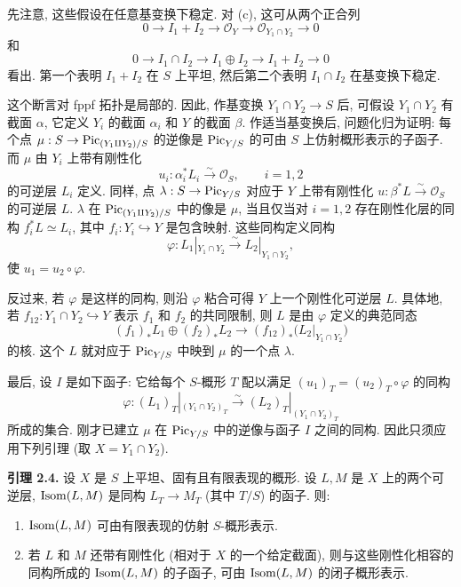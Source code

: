 先注意, 这些假设在任意基变换下稳定. 对 (c), 这可从两个正合列
\[
  0\longrightarrow I_1+I_2\longrightarrow\mathcal O_Y
  \longrightarrow\mathcal O_{Y_1\cap Y_2}\longrightarrow0
\]
和
\[
  0\longrightarrow I_1\cap I_2\longrightarrow I_1\oplus I_2
  \longrightarrow I_1+I_2\longrightarrow0
\]
看出. 第一个表明 $I_1+I_2$ 在 $S$ 上平坦, 然后第二个表明 $I_1\cap I_2$ 在基变换下稳定.

这个断言对 fppf 拓扑是局部的. 因此, 作基变换 $Y_1\cap Y_2\to S$ 后, 可假设 $Y_1\cap Y_2$ 有截面 $\alpha$, 它定义 $Y_i$ 的截面 $\alpha_i$ 和 $Y$ 的截面 $\beta$. 作适当基变换后, 问题化归为证明: 每个点 $\mu:S\to\operatorname{Pic}_{(Y_1\amalg Y_2)/S}$ 的逆像是 $\operatorname{Pic}_{Y/S}$ 的可由 $S$ 上仿射概形表示的子函子. 而 $\mu$ 由 $Y_i$ 上带有刚性化
\[
  u_i:\alpha_i^*L_i\xrightarrow{\sim}\mathcal O_S,
  \qquad i=1,2
\]
的可逆层 $L_i$ 定义. 同样, 点 $\lambda:S\to\operatorname{Pic}_{Y/S}$ 对应于 $Y$ 上带有刚性化 $u:\beta^*L\xrightarrow{\sim}\mathcal O_S$ 的可逆层 $L$. $\lambda$ 在 $\operatorname{Pic}_{(Y_1\amalg Y_2)/S}$ 中的像是 $\mu$, 当且仅当对 $i=1,2$ 存在刚性化层的同构 $f_i^*L\simeq L_i$, 其中 $f_i:Y_i\hookrightarrow Y$ 是包含映射. 这些同构定义同构
\[
  \varphi:L_1|_{Y_1\cap Y_2}\xrightarrow{\sim}
  L_2|_{Y_1\cap Y_2},
\]
使 $u_1=u_2\circ\varphi$.

反过来, 若 $\varphi$ 是这样的同构, 则沿 $\varphi$ 粘合可得 $Y$ 上一个刚性化可逆层 $L$. 具体地, 若 $f_{12}:Y_1\cap Y_2\hookrightarrow Y$ 表示 $f_1$ 和 $f_2$ 的共同限制, 则 $L$ 是由 $\varphi$ 定义的典范同态
\[
  (f_1)_*L_1\oplus(f_2)_*L_2
  \longrightarrow
  (f_{12})_*\bigl(L_2|_{Y_1\cap Y_2}\bigr)
\]
的核. 这个 $L$ 就对应于 $\operatorname{Pic}_{Y/S}$ 中映到 $\mu$ 的一个点 $\lambda$.

最后, 设 $I$ 是如下函子: 它给每个 $S$-概形 $T$ 配以满足 $(u_1)_T=(u_2)_T\circ\varphi$ 的同构
\[
  \varphi:(L_1)_T|_{(Y_1\cap Y_2)_T}\xrightarrow{\sim}
  (L_2)_T|_{(Y_1\cap Y_2)_T}
\]
所成的集合. 刚才已建立 $\mu$ 在 $\operatorname{Pic}_{Y/S}$ 中的逆像与函子 $I$ 之间的同构. 因此只须应用下列引理 (取 $X=Y_1\cap Y_2$).

\textbf{引理 2.4.} 设 $X$ 是 $S$ 上平坦、固有且有限表现的概形. 设 $L,M$ 是 $X$ 上的两个可逆层, $\operatorname{Isom}(L,M)$ 是同构 $L_T\to M_T$ (其中 $T/S$) 的函子. 则:
\begin{enumerate}[label=\roman*)]
\item $\operatorname{Isom}(L,M)$ 可由有限表现的仿射 $S$-概形表示.
\item 若 $L$ 和 $M$ 还带有刚性化 (相对于 $X$ 的一个给定截面), 则与这些刚性化相容的同构所成的 $\operatorname{Isom}(L,M)$ 的子函子, 可由 $\operatorname{Isom}(L,M)$ 的闭子概形表示.
\end{enumerate}

